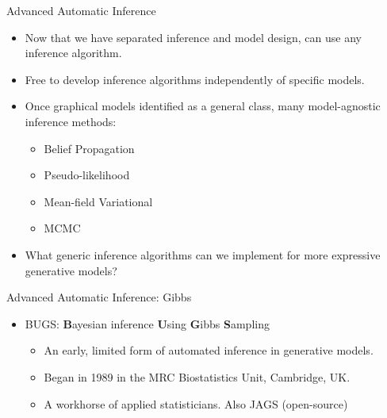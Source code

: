 \begin{frame}{Advanced Automatic Inference}

    \begin{itemize}
      \item Now that we have separated inference and model design, can use any inference algorithm.
      \item Free to develop inference algorithms independently of specific models.
      \item Once graphical models identified as a general class, many model-agnostic inference methods:
      \begin{itemize}
	      \item Belief Propagation
	      \item Pseudo-likelihood
	      \item Mean-field Variational
	      \item MCMC
	    \end{itemize}
    \item What generic inference algorithms can we implement for more expressive generative models?
    \end{itemize}
\end{frame}


\begin{frame}{Advanced Automatic Inference: Gibbs}
    \begin{itemize}
      \item BUGS: {\bf B}ayesian inference {\bf U}sing {\bf G}ibbs {\bf S}ampling
        \begin{itemize}
      \item An early, limited form of automated inference in generative models.
      \item Began in 1989 in the MRC Biostatistics Unit, Cambridge, UK.
      \item A workhorse of applied statisticians.  Also JAGS (open-source)
    \end{itemize}
    \end{itemize}
    
\begin{alltt}
{\tiny
}
\end{alltt}    

\end{frame}


